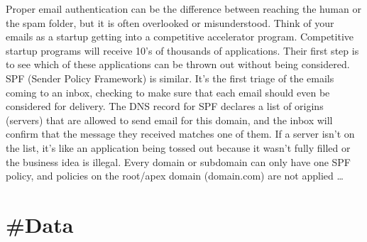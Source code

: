 \documentclass[10pt,a4paper]{article}
\begin{document}
\begin{multicols}{2}
Proper email authentication can be the difference between reaching the human or the spam folder, but it is often overlooked or misunderstood.
Think of your emails as a startup getting into a competitive accelerator program.
Competitive startup programs will receive 10's of thousands of applications. Their first step is to see which of these applications can be thrown out without being considered.
SPF (Sender Policy Framework) is similar. It's the first triage of the emails coming to an inbox, checking to make sure that each email should even be considered for delivery.
The DNS record for SPF declares a list of origins (servers) that are allowed to send email for this domain, and the inbox will confirm that the message they received matches one of them. If a server isn't on the list, it's like an application being tossed out because it wasn't fully filled or the business idea is illegal.
Every domain or subdomain can only have one SPF policy, and policies on the root/apex domain (domain.com) are not applied
\dots\par
\end{multicols}

\newpage
\section{\#Data}
\end{document}
